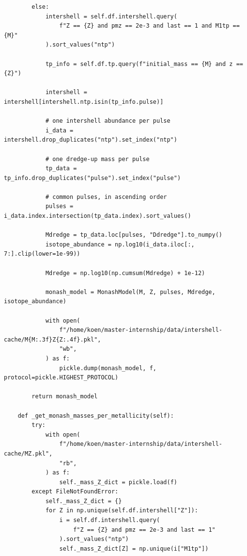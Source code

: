 \documentclass[a4paper,10pt]{article}
\begin{document}
\begin{verbatim}
        else:
            intershell = self.df.intershell.query(
                f"Z == {Z} and pmz == 2e-3 and last == 1 and M1tp == {M}"
            ).sort_values("ntp")

            tp_info = self.df.tp.query(f"initial_mass == {M} and z == {Z}")

            intershell = intershell[intershell.ntp.isin(tp_info.pulse)]

            # one intershell abundance per pulse
            i_data = intershell.drop_duplicates("ntp").set_index("ntp")

            # one dredge-up mass per pulse
            tp_data = tp_info.drop_duplicates("pulse").set_index("pulse")

            # common pulses, in ascending order
            pulses = i_data.index.intersection(tp_data.index).sort_values()

            Mdredge = tp_data.loc[pulses, "Ddredge"].to_numpy()
            isotope_abundance = np.log10(i_data.iloc[:, 7:].clip(lower=1e-99))

            Mdredge = np.log10(np.cumsum(Mdredge) + 1e-12)

            monash_model = MonashModel(M, Z, pulses, Mdredge, isotope_abundance)

            with open(
                f"/home/koen/master-internship/data/intershell-cache/M{M:.3f}Z{Z:.4f}.pkl",
                "wb",
            ) as f:
                pickle.dump(monash_model, f, protocol=pickle.HIGHEST_PROTOCOL)

        return monash_model

    def _get_monash_masses_per_metallicity(self):
        try:
            with open(
                f"/home/koen/master-internship/data/intershell-cache/MZ.pkl",
                "rb",
            ) as f:
                self._mass_Z_dict = pickle.load(f)
        except FileNotFoundError:
            self._mass_Z_dict = {}
            for Z in np.unique(self.df.intershell["Z"]):
                i = self.df.intershell.query(
                    f"Z == {Z} and pmz == 2e-3 and last == 1"
                ).sort_values("ntp")
                self._mass_Z_dict[Z] = np.unique(i["M1tp"])
\end{verbatim}
\nextpage
\end{document}
